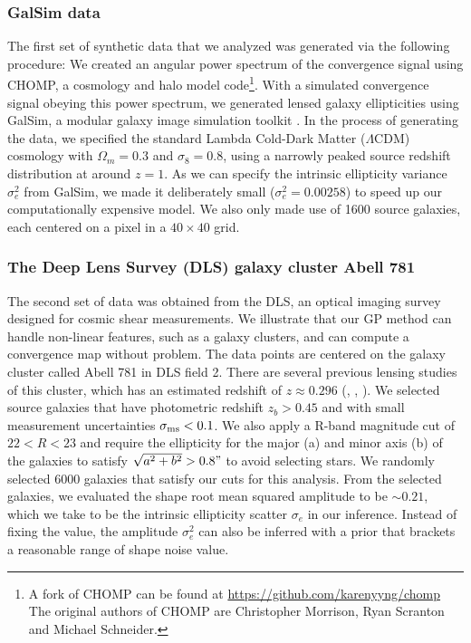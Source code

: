 \subsubsection{{\sc GalSim} data}
The first set of synthetic data that we analyzed was generated via the following procedure: 
We created an angular power spectrum of the convergence signal using {\sc
CHOMP}, a cosmology and halo model code\footnote{A fork of {\sc CHOMP} can be
found at \href{https://github.com/karenyyng/chomp}{https://github.com/karenyyng/chomp}
The original authors of CHOMP are Christopher Morrison, Ryan Scranton and Michael Schneider.
}. 
With a simulated convergence signal obeying this power spectrum, 
we generated lensed galaxy ellipticities using {\sc GalSim}, a modular galaxy image
simulation toolkit \citep{Rowe2015}.
In the process of generating the data, we specified 
the standard Lambda Cold-Dark Matter ($\Lambda$CDM) cosmology with $\Omega_m =
0.3$ and $\sigma_8 = 0.8$, using a narrowly peaked source redshift distribution
at around $z = 1$. As we can specify the intrinsic ellipticity variance
$\sigma_e^2$ from {\sc GalSim}, we made it deliberately small ($\sigma_e^2 =
0.00258$) to speed up our computationally expensive model. 
We also only made use of 1600 source galaxies, each centered on a pixel in a 
$40 \times 40$ grid. 
 
\subsubsection{The Deep Lens Survey (DLS) galaxy cluster Abell 781}
The second set of data was obtained from the DLS, an optical imaging survey 
designed for cosmic shear measurements.  
We illustrate that
our GP method can handle non-linear features, such as a galaxy clusters, and 
can compute a convergence map without problem. 
The data points
are centered on the galaxy cluster called Abell 781 in DLS field 2.
There are several previous lensing studies of this cluster, which has an estimated redshift
of $z \approx 0.296$ (\citealt{Wittman2014}, \citealt{Cook2012}, \citealt{Sehgal2008}). 
We selected source galaxies that have photometric redshift $z_b >
0.45$ and with small measurement uncertainties $\sigma_{\rm ms} < 0.1$. We also apply  
a R-band magnitude cut of $22 < R < 23$ and require the ellipticity for the
major (a) and minor axis (b) of the galaxies to satisfy $\sqrt{a^2 + b^2} > 0.8"$ 
to avoid selecting stars. We randomly selected 6000 galaxies that satisfy our
cuts for this analysis. From the selected galaxies, we evaluated the shape
root mean squared amplitude to be $\sim 0.21$, which we take to be the
intrinsic ellipticity scatter $\sigma_e$ in our inference.
Instead of fixing the value, the amplitude
$\sigma_e^2$ can also be inferred with a prior that brackets a reasonable range of
shape noise value.  
 
